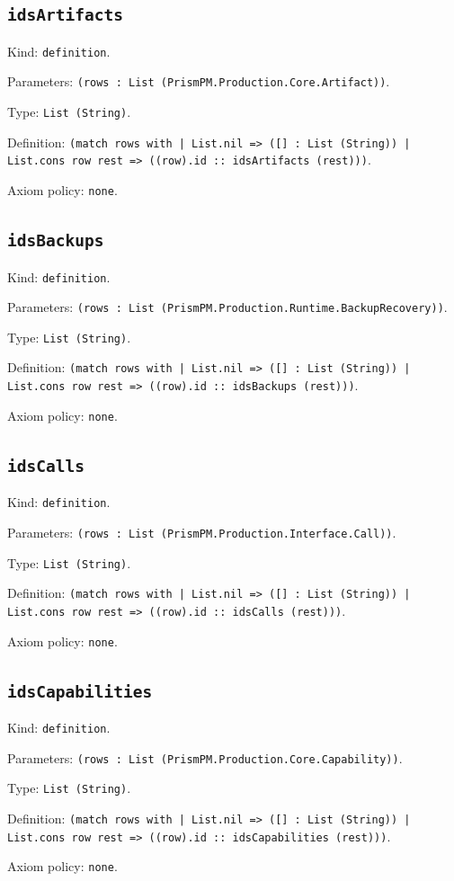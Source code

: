 \documentclass[11pt]{article}
\begin{document}
\subsection*{\texttt{idsArtifacts}}
\noindent Kind: \texttt{definition}.\par
\noindent Parameters: \texttt{(rows : List (PrismPM.Production.Core.Artifact))}.\par
\noindent Type: \texttt{List (String)}.\par
\noindent Definition: \texttt{(match rows with | List.nil => ([] : List (String)) | List.cons row rest => ((row).id :: idsArtifacts (rest)))}.\par
\noindent Axiom policy: \texttt{none}.\par
\subsection*{\texttt{idsBackups}}
\noindent Kind: \texttt{definition}.\par
\noindent Parameters: \texttt{(rows : List (PrismPM.Production.Runtime.BackupRecovery))}.\par
\noindent Type: \texttt{List (String)}.\par
\noindent Definition: \texttt{(match rows with | List.nil => ([] : List (String)) | List.cons row rest => ((row).id :: idsBackups (rest)))}.\par
\noindent Axiom policy: \texttt{none}.\par
\subsection*{\texttt{idsCalls}}
\noindent Kind: \texttt{definition}.\par
\noindent Parameters: \texttt{(rows : List (PrismPM.Production.Interface.Call))}.\par
\noindent Type: \texttt{List (String)}.\par
\noindent Definition: \texttt{(match rows with | List.nil => ([] : List (String)) | List.cons row rest => ((row).id :: idsCalls (rest)))}.\par
\noindent Axiom policy: \texttt{none}.\par
\subsection*{\texttt{idsCapabilities}}
\noindent Kind: \texttt{definition}.\par
\noindent Parameters: \texttt{(rows : List (PrismPM.Production.Core.Capability))}.\par
\noindent Type: \texttt{List (String)}.\par
\noindent Definition: \texttt{(match rows with | List.nil => ([] : List (String)) | List.cons row rest => ((row).id :: idsCapabilities (rest)))}.\par
\noindent Axiom policy: \texttt{none}.\par
\end{document}
